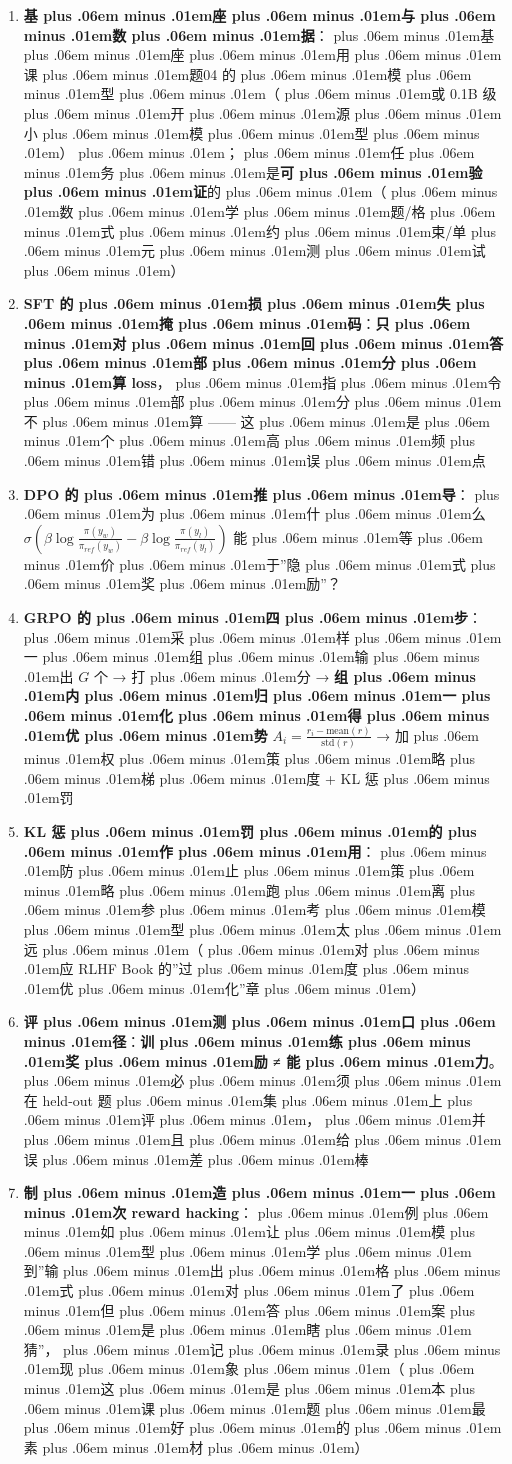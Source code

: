 \documentclass[
]{article}
\providecommand{\tightlist}{%
  \setlength{\itemsep}{0pt}\setlength{\parskip}{0pt}}
\def\zh#1{{\zhfont #1}}
\def\sym#1{{\symfont #1}}
\def\zhglue{\hskip0pt plus .06em minus .01em}
\begin{document}
\begin{enumerate}
\def\labelenumi{\arabic{enumi}.}
\tightlist
\item
  \textbf{\zh{基\zhglue 座\zhglue 与\zhglue 数\zhglue 据}}\zh{：\zhglue 基\zhglue 座\zhglue 用\zhglue 课\zhglue 题}04 \zh{的\zhglue 模\zhglue 型\zhglue （\zhglue 或} 0.1B \zh{级\zhglue 开\zhglue 源\zhglue 小\zhglue 模\zhglue 型\zhglue ）\zhglue ；\zhglue 任\zhglue 务\zhglue 是}\textbf{\zh{可\zhglue 验\zhglue 证}}\zh{的\zhglue （\zhglue 数\zhglue 学\zhglue 题}/\zh{格\zhglue 式\zhglue 约\zhglue 束}/\zh{单\zhglue 元\zhglue 测\zhglue 试\zhglue ）}
\item
  \textbf{SFT \zh{的\zhglue 损\zhglue 失\zhglue 掩\zhglue 码}}\zh{：}\textbf{\zh{只\zhglue 对\zhglue 回\zhglue 答\zhglue 部\zhglue 分\zhglue 算} loss}\zh{，\zhglue 指\zhglue 令\zhglue 部\zhglue 分\zhglue 不\zhglue 算} ------ \zh{这\zhglue 是\zhglue 个\zhglue 高\zhglue 频\zhglue 错\zhglue 误\zhglue 点}
\item
  \textbf{DPO \zh{的\zhglue 推\zhglue 导}}\zh{：\zhglue 为\zhglue 什\zhglue 么} \(\sigma(\beta \log\frac{\pi(y_w)}{\pi_{ref}(y_w)} - \beta\log\frac{\pi(y_l)}{\pi_{ref}(y_l)})\) \zh{能\zhglue 等\zhglue 价\zhglue 于}''\zh{隐\zhglue 式\zhglue 奖\zhglue 励}''\zh{？}
\item
  \textbf{GRPO \zh{的\zhglue 四\zhglue 步}}\zh{：\zhglue 采\zhglue 样\zhglue 一\zhglue 组\zhglue 输\zhglue 出} \(G\) \zh{个} \sym{→} \zh{打\zhglue 分} \sym{→} \textbf{\zh{组\zhglue 内\zhglue 归\zhglue 一\zhglue 化\zhglue 得\zhglue 优\zhglue 势}} \(A_i = \frac{r_i - \mathrm{mean}(r)}{\mathrm{std}(r)}\) \sym{→} \zh{加\zhglue 权\zhglue 策\zhglue 略\zhglue 梯\zhglue 度} + KL \zh{惩\zhglue 罚}
\item
  \textbf{KL \zh{惩\zhglue 罚\zhglue 的\zhglue 作\zhglue 用}}\zh{：\zhglue 防\zhglue 止\zhglue 策\zhglue 略\zhglue 跑\zhglue 离\zhglue 参\zhglue 考\zhglue 模\zhglue 型\zhglue 太\zhglue 远\zhglue （\zhglue 对\zhglue 应} RLHF Book \zh{的}''\zh{过\zhglue 度\zhglue 优\zhglue 化}''\zh{章\zhglue ）}
\item
  \textbf{\zh{评\zhglue 测\zhglue 口\zhglue 径}}\zh{：}\textbf{\zh{训\zhglue 练\zhglue 奖\zhglue 励} \sym{≠} \zh{能\zhglue 力}}\zh{。\zhglue 必\zhglue 须\zhglue 在} held-out \zh{题\zhglue 集\zhglue 上\zhglue 评\zhglue ，\zhglue 并\zhglue 且\zhglue 给\zhglue 误\zhglue 差\zhglue 棒}
\item
  \textbf{\zh{制\zhglue 造\zhglue 一\zhglue 次} reward hacking}\zh{：\zhglue 例\zhglue 如\zhglue 让\zhglue 模\zhglue 型\zhglue 学\zhglue 到}''\zh{输\zhglue 出\zhglue 格\zhglue 式\zhglue 对\zhglue 了\zhglue 但\zhglue 答\zhglue 案\zhglue 是\zhglue 瞎\zhglue 猜}''\zh{，\zhglue 记\zhglue 录\zhglue 现\zhglue 象\zhglue （\zhglue 这\zhglue 是\zhglue 本\zhglue 课\zhglue 题\zhglue 最\zhglue 好\zhglue 的\zhglue 素\zhglue 材\zhglue ）}
\end{enumerate}
\end{document}
